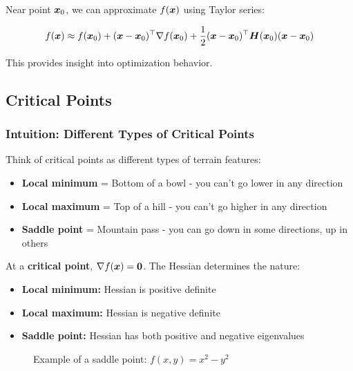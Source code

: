 Near point $\boldsymbol{x}_0$, we can approximate $f(\boldsymbol{x})$ using Taylor series:

\begin{equation}
f(\boldsymbol{x}) \approx f(\boldsymbol{x}_0) + (\boldsymbol{x} - \boldsymbol{x}_0)^\top \nabla f(\boldsymbol{x}_0) + \frac{1}{2}(\boldsymbol{x} - \boldsymbol{x}_0)^\top \boldsymbol{H}(\boldsymbol{x}_0) (\boldsymbol{x} - \boldsymbol{x}_0)
\end{equation}

This provides insight into optimization behavior.

\subsection{Critical Points}

\subsubsection{Intuition: Different Types of Critical Points}

Think of critical points as different types of terrain features:

\begin{itemize}
    \item \textbf{Local minimum} = Bottom of a bowl - you can't go lower in any direction
    \item \textbf{Local maximum} = Top of a hill - you can't go higher in any direction  
    \item \textbf{Saddle point} = Mountain pass - you can go down in some directions, up in others
\end{itemize}

At a \textbf{critical point}, $\nabla f(\boldsymbol{x}) = \boldsymbol{0}$. The Hessian determines the nature:
\begin{itemize}
    \item \textbf{Local minimum:} Hessian is positive definite
    \item \textbf{Local maximum:} Hessian is negative definite
    \item \textbf{Saddle point:} Hessian has both positive and negative eigenvalues
\end{itemize}

\begin{figure}[h]
\centering
{}
\caption{Example of a saddle point: $f(x,y) = x^2 - y^2$}
\label{fig:saddle-point}
\end{figure}

